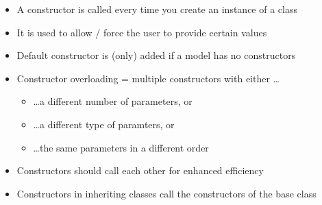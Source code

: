 \documentclass{article}
\begin{document}
\begin{itemize}
    \item A constructor is called every time you create an instance of a class
    \item It is used to allow / force the user to provide certain values
    \item Default constructor is (only) added if a model has no constructors
    \item Constructor overloading = multiple constructors with either \dots
    \begin{itemize}
        \item \dots a different number of parameters, or
        \item \dots a different type of paramters, or
        \item \dots the same parameters in a different order
    \end{itemize}
    \item Constructors should call each other for enhanced efficiency
    \item Constructors in inheriting classes call the constructors of the base class
\end{itemize}
\end{document}
